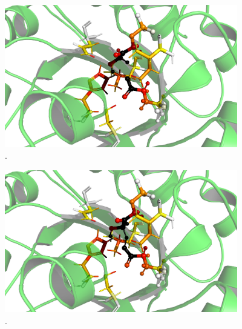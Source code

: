 \documentclass[a4paper,11pt]{refart}
\begin{document}
\hspace*{-\leftmarginwidth}
\begin{minipage}{\fullwidth}
	\begin{figure}[H]
		\begin{center}
			\includegraphics[width=4in]{images/tut6_img9}
			\caption{.}
			\label{fig_tut6_8}
		\end{center}
	\end{figure}
\end{minipage}

\hspace*{-\leftmarginwidth}
\begin{minipage}{\fullwidth}
	\begin{figure}[H]
		\begin{center}
			\includegraphics[width=4in]{images/tut6_img10}
			\caption{.}
			\label{fig_tut6_9}
		\end{center}
	\end{figure}
\end{minipage}
\end{document}
